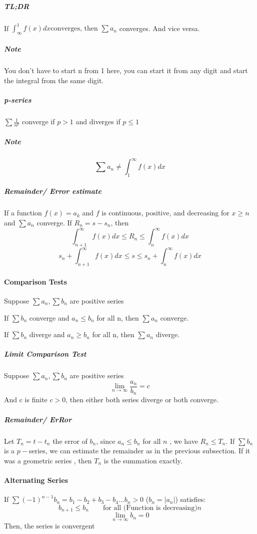 \documentclass{article}
\begin{document}
\subparagraph{TL;DR}
If $ \int^{1}_{\infty} f(x) dx \text{converges, then } \sum a_n $ converges. And vice versa.  

\subparagraph{Note}
You don't have to start n from 1 here, you can start it from any digit and start the integral from the same digit.

\subparagraph{p-series}
$ \sum \frac{1}{n^p} $ converge if $ p>1 $ and diverges if $ p \leq 1 $ 

\subparagraph{Note} \[
	\sum a_n \neq \int_{1}^{\infty} f(x) dx  
\]
\subparagraph{Remainder/ Error estimate} If a function $ f(x) = a_k $ 
and $ f $ is continuous, positive, and decreasing for $ x \geq n $ and $ \sum a_n $ converge. 
If $ R_n = s - s_n	$, then
\[
	\int_{n+1}^{\infty} f(x) dx \leq R_n \leq \int_{n}^{\infty} f(x) dx  
\]
\[
	s_n+\int_{n+1}^{\infty} f(x) dx \leq s \leq s_n + \int_{n}^{\infty} f(x) dx  
\]


\noindent\hrulefill 
\newpage
\paragraph{Comparison Tests}
Suppose $ \sum a_n, \sum b_n $ are positive series

If $ \sum b_n $ converge and $ a_n \leq b_n $ for all n, then $ \sum a_n $ converge.

If $ \sum b_n $ diverge and $ a_n \geq b_n $  for all n, then $ \sum a_n $ diverge.

\subparagraph{Limit Comparison Test}
Suppose $ \sum a_n, \sum b_n $ are positive series
\[
	\lim_{n \to \infty} \frac{a_n}{b_n}=c
\] And c is finite $ c>0 $, then either both series diverge or both converge.

\subparagraph{Remainder/ ErRor} 
Let $ T_n = t - t_n$ the error of $b_n$, since
$ a_n \leq b_n  $ for all $ n $ , we have $ R_n \leq T_n $. If $ \sum b_n  $ is a $ p- $series, we can estimate the remainder as in the previous subsection. If it was a geometric series
, then $T_n$ is the summation exactly. 


\noindent\hrulefill 

\paragraph{Alternating Series}
If $ \sum (-1)^{n-1}b_n = b_1 -b_2+b_3-b_4 ... b_n>0 $ ($b_n= |a_n|$) satisfies:
\begin{equation*}
	b_{n+1} \leq b_n \qquad \text{for all (Function is decreasing)} n
\end{equation*}
$$	\lim_{n \to \infty} b_n = 0$$
Then, the series is convergent
\end{document}
